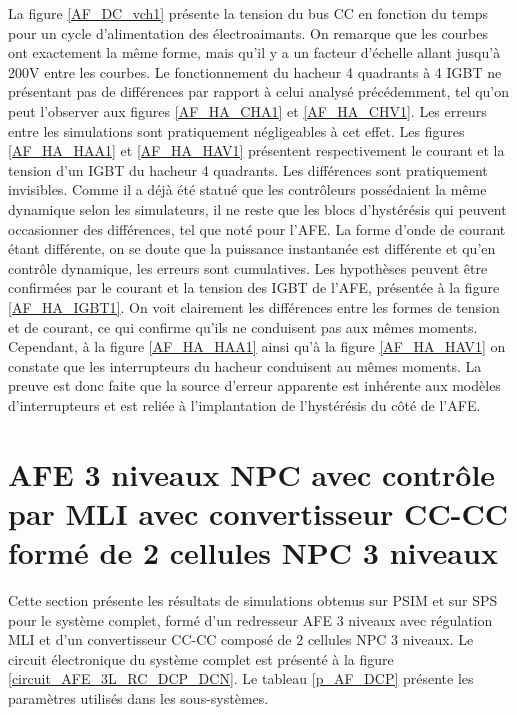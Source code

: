 La figure \ref{AF_DC_vch1} présente la tension du bus CC en fonction du temps pour un cycle d'alimentation des électroaimants. On remarque que les courbes ont exactement la même forme, mais qu'il y a un facteur d'échelle allant jusqu'à 200V entre les courbes. Le fonctionnement du hacheur 4 quadrants à 4 IGBT ne présentant pas de différences par rapport à celui analysé précédemment, tel qu'on peut l'observer aux figures \ref{AF_HA_CHA1} et \ref{AF_HA_CHV1}. Les erreurs entre les simulations sont pratiquement négligeables à cet effet. Les figures \ref{AF_HA_HAA1} et \ref{AF_HA_HAV1} présentent respectivement le courant et la tension d'un IGBT du hacheur 4 quadrants. Les différences sont pratiquement invisibles. Comme il a déjà été statué que les contrôleurs possédaient la même dynamique selon les simulateurs, il ne reste que les blocs d'hystérésis qui peuvent occasionner des différences, tel que noté pour l'AFE. La forme d'onde de courant étant différente, on se doute que la puissance instantanée est différente et qu'en contrôle dynamique, les erreurs sont cumulatives. Les hypothèses peuvent être confirmées par le courant et la tension des IGBT de l'AFE, présentée à la figure \ref{AF_HA_IGBT1}. On voit clairement les différences entre les formes de tension et de courant, ce qui confirme qu'ils ne conduisent pas aux mêmes moments. Cependant, à la figure \ref{AF_HA_HAA1} ainsi qu'à la figure \ref{AF_HA_HAV1} on constate que les interrupteurs du hacheur conduisent au mêmes moments. La preuve est donc faite que la source d'erreur apparente est inhérente aux modèles d'interrupteurs et est reliée à l'implantation de l'hystérésis du côté de l'AFE. 

\section{AFE 3 niveaux NPC avec contrôle par MLI avec convertisseur CC-CC formé de 2 cellules NPC 3 niveaux}
Cette section présente les résultats de simulations obtenus sur PSIM et sur SPS pour le système complet, formé d'un redresseur AFE 3 niveaux avec régulation MLI et d'un convertisseur CC-CC composé de 2 cellules NPC 3 niveaux.  Le circuit électronique du système complet est présenté à la figure \ref{circuit_AFE_3L_RC_DCP_DCN}. Le tableau \ref{p_AF_DCP} présente les paramètres utilisés dans les sous-systèmes.

